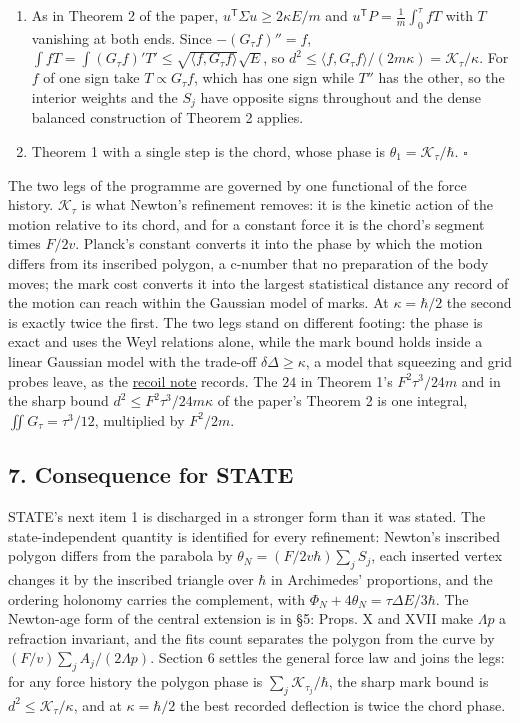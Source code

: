\documentclass[11pt,a4paper]{article}
\begin{document}
\begin{enumerate}
\def\labelenumi{(\alph{enumi})}
\setcounter{enumi}{1}
\item
  As in Theorem 2 of the paper, \(u^{\mathsf T}\Sigma u\ge2\kappa E/m\)
  and \(u^{\mathsf T}P=\frac1m\int_0^\tau fT\) with \(T\) vanishing at
  both ends. Since \(-(G_\tau f)''=f\),
  \(\int fT=\int(G_\tau f)'T'\le\sqrt{\langle f,G_\tau f\rangle}\sqrt E\),
  so
  \(d^2\le\langle f,G_\tau f\rangle/(2m\kappa)=\mathcal K_\tau/\kappa\).
  For \(f\) of one sign take \(T\propto G_\tau f\), which has one sign
  while \(T''\) has the other, so the interior weights and the \(S_j\)
  have opposite signs throughout and the dense balanced construction of
  Theorem 2 applies.
\item
  Theorem 1 with a single step is the chord, whose phase is
  \(\theta_1=\mathcal K_\tau/\hbar\). \(\square\)
\end{enumerate}

The two legs of the programme are governed by one functional of the
force history. \(\mathcal K_\tau\) is what Newton's refinement removes:
it is the kinetic action of the motion relative to its chord, and for a
constant force it is the chord's segment times \(F/2v\). Planck's
constant converts it into the phase by which the motion differs from its
inscribed polygon, a c-number that no preparation of the body moves; the
mark cost converts it into the largest statistical distance any record
of the motion can reach within the Gaussian model of marks. At
\(\kappa=\hbar/2\) the second is exactly twice the first. The two legs
stand on different footing: the phase is exact and uses the Weyl
relations alone, while the mark bound holds inside a linear Gaussian
model with the trade-off \(\delta\Delta\ge\kappa\), a model that
squeezing and grid probes leave, as the
\href{record-costs-recoil.md}{recoil note} records. The \(24\) in
Theorem 1's \(F^2\tau^3/24m\) and in the sharp bound
\(d^2\le F^2\tau^3/24m\kappa\) of the paper's Theorem 2 is one integral,
\(\iint G_\tau=\tau^3/12\), multiplied by \(F^2/2m\).

\hypertarget{consequence-for-state}{%
\subsection{7. Consequence for STATE}\label{consequence-for-state}}

STATE's next item 1 is discharged in a stronger form than it was stated.
The state-independent quantity is identified for every refinement:
Newton's inscribed polygon differs from the parabola by
\(\theta_N=(F/2v\hbar)\sum_jS_j\), each inserted vertex changes it by
the inscribed triangle over \(\hbar\) in Archimedes' proportions, and
the ordering holonomy carries the complement, with
\(\Phi_N+4\theta_N=\tau\Delta E/3\hbar\). The Newton-age form of the
central extension is in §5: Props. X and XVII make \(\Lambda p\) a
refraction invariant, and the fits count separates the polygon from the
curve by \((F/v)\sum_jA_j/(2\Lambda p)\). Section 6 settles the general
force law and joins the legs: for any force history the polygon phase is
\(\sum_j\mathcal K_{\tau_j}/\hbar\), the sharp mark bound is
\(d^2\le\mathcal K_\tau/\kappa\), and at \(\kappa=\hbar/2\) the best
recorded deflection is twice the chord phase.
\end{document}
